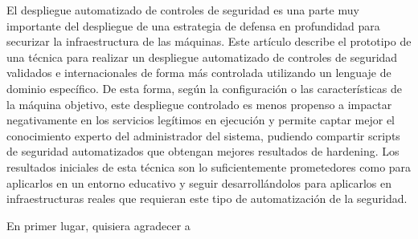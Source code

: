 \documentclass[
11pt, %
spanish, %
singlespacing, %
headsepline, %
]{MastersDoctoralThesis} %
\begin{document}
\begin{resumen}
\addchaptertocentry{\resumename} %
El despliegue automatizado de controles de seguridad es una parte muy importante del despliegue de una estrategia de defensa en profundidad para securizar la infraestructura de las máquinas. Este artículo describe el prototipo de una técnica para realizar un despliegue automatizado de controles de seguridad validados e internacionales de forma más controlada utilizando un lenguaje de dominio específico. De esta forma, según la configuración o las características de la máquina objetivo, este despliegue controlado es menos propenso a impactar negativamente en los servicios legítimos en ejecución y permite captar mejor el conocimiento experto del administrador del sistema, pudiendo compartir scripts de seguridad automatizados que obtengan mejores resultados de hardening. Los resultados iniciales de esta técnica son lo suficientemente prometedores como para aplicarlos en un entorno educativo y seguir desarrollándolos para aplicarlos en infraestructuras reales que requieran este tipo de automatización de la seguridad.
\end{resumen}


\begin{acknowledgements}
\addchaptertocentry{\acknowledgementname} %

En primer lugar, quisiera agradecer a 
\end{acknowledgements}


\tableofcontents %

\listoffigures %

\listoftables %


\end{document}
